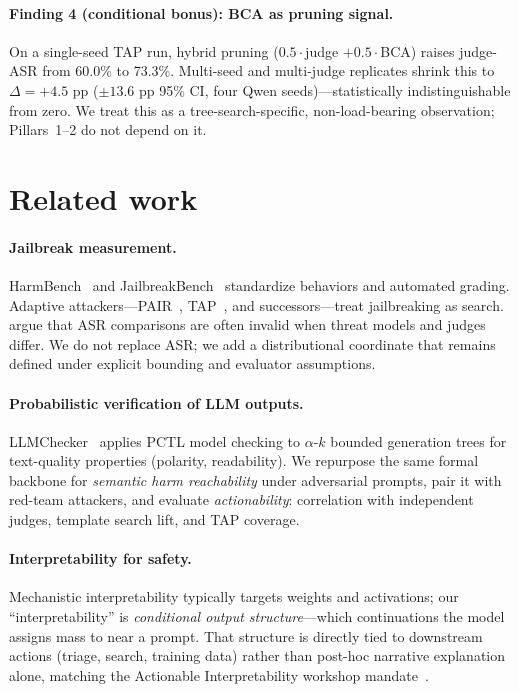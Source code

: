 \documentclass{article}
\newcommand{\BCA}{\textsc{BCA}}
\newcommand{\ASR}{\textsc{ASR}}
\begin{document}
\paragraph{Finding 4 (conditional bonus): \BCA{} as pruning signal.}
On a single-seed \textsc{TAP} run, hybrid pruning ($0.5\cdot$judge $+0.5\cdot$\BCA) raises judge-\ASR{} from 60.0\% to 73.3\%.
Multi-seed and multi-judge replicates shrink this to $\Delta{=}+4.5$ pp ($\pm 13.6$ pp 95\% CI, four Qwen seeds)---statistically indistinguishable from zero.
We treat this as a tree-search-specific, non-load-bearing observation; Pillars~1--2 do not depend on it.

\section{Related work}
\label{sec:related}

\paragraph{Jailbreak measurement.}
HarmBench~\citep{mazeika2024harmbench} and JailbreakBench~\citep{chao2024jailbreakbench} standardize behaviors and automated grading.
Adaptive attackers---PAIR~\citep{chao2023pair}, \textsc{TAP}~\citep{mehrotra2024tap}, and successors---treat jailbreaking as search.
\citet{chouldechova2026measurement} argue that \ASR{} comparisons are often invalid when threat models and judges differ.
We do not replace \ASR{}; we add a distributional coordinate that remains defined under explicit bounding and evaluator assumptions.

\paragraph{Probabilistic verification of LLM outputs.}
LLMChecker~\citep{gross2025llmchecker} applies PCTL model checking to $\alpha$-$k$ bounded generation trees for text-quality properties (polarity, readability).
We repurpose the same formal backbone for \emph{semantic harm reachability} under adversarial prompts, pair it with red-team attackers, and evaluate \emph{actionability}: correlation with independent judges, template search lift, and \textsc{TAP} coverage.

\paragraph{Interpretability for safety.}
Mechanistic interpretability typically targets weights and activations; our ``interpretability'' is \emph{conditional output structure}---which continuations the model assigns mass to near a prompt.
That structure is directly tied to downstream actions (triage, search, training data) rather than post-hoc narrative explanation alone, matching the Actionable Interpretability workshop mandate~\citep{actionableinterp2026}.
\end{document}
